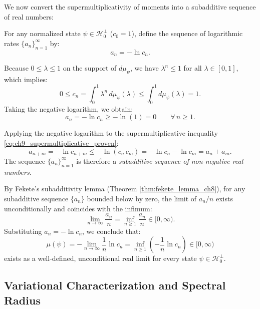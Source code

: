 We now convert the supermultiplicativity of moments into a subadditive sequence of real numbers:
\begin{definition}
\label{def:logarithmic_rate_sequence}
For any normalized state $\psi \in \mathcal{H}_0^\perp$ ($c_0 = 1$), define the sequence of logarithmic rates $\{a_n\}_{n=1}^\infty$ by:
\begin{equation}
\label{eq:ch9_an_def}
a_n = -\ln c_n.
\end{equation}
\end{definition}

Because $0 \le \lambda \le 1$ on the support of $d\mu_\psi$, we have $\lambda^n \le 1$ for all $\lambda \in [0, 1]$, which implies:
\begin{equation}
0 \le c_n = \int_0^1 \lambda^n \, d\mu_\psi(\lambda) \le \int_0^1 d\mu_\psi(\lambda) = 1.
\end{equation}
Taking the negative logarithm, we obtain:
\begin{equation}
a_n = -\ln c_n \ge -\ln(1) = 0 \qquad \forall \, n \ge 1.
\end{equation}

Applying the negative logarithm to the supermultiplicative inequality \eqref{eq:ch9_supermultiplicative_proven}:
\begin{equation}
\label{eq:ch9_subadditivity_proven}
a_{n+m} = -\ln c_{n+m} \le -\ln(c_n \, c_m) = -\ln c_n - \ln c_m = a_n + a_m.
\end{equation}
The sequence $\{a_n\}_{n=1}^\infty$ is therefore a \emph{subadditive sequence of non-negative real numbers}.

By Fekete's subadditivity lemma (Theorem \ref{thm:fekete_lemma_ch8}), for any subadditive sequence $\{a_n\}$ bounded below by zero, the limit of $a_n/n$ exists unconditionally and coincides with the infimum:
\begin{equation}
\label{eq:ch9_fekete_limit_inf}
\lim_{n \to \infty} \frac{a_n}{n} = \inf_{n \ge 1} \frac{a_n}{n} \in [0, \infty).
\end{equation}
Substituting $a_n = -\ln c_n$, we conclude that:
\begin{equation}
\mu(\psi) = -\lim_{n \to \infty} \frac{1}{n} \ln c_n = \inf_{n \ge 1} \left( -\frac{1}{n} \ln c_n \right) \in [0, \infty)
\end{equation}
exists as a well-defined, unconditional real limit for every state $\psi \in \mathcal{H}_0^\perp$.

\subsection{Variational Characterization and Spectral Radius}
\label{subsec:variational_spectral_radius}

